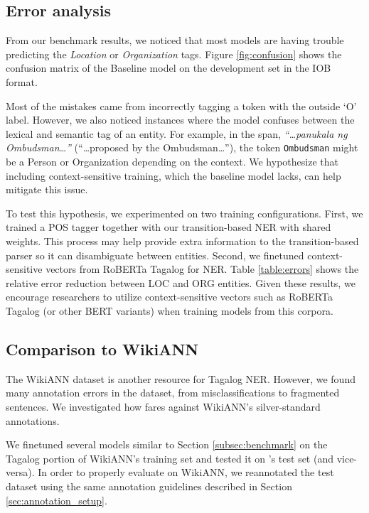 \documentclass[11pt]{article}
\begin{document}
\subsection{Error analysis}

From our benchmark results, we noticed that most models are having trouble predicting the \textit{Location} or \textit{Organization} tags.
Figure \ref{fig:confusion} shows the confusion matrix of the Baseline model on the development set in the IOB format.

Most of the mistakes came from incorrectly tagging a token with the outside `O' label.
However, we also noticed instances where the model confuses between the lexical and semantic tag of an entity.
For example, in the span, \textit{``\ldots panukala ng Ombudsman\ldots ''} (``\ldots proposed by the Ombudsman\ldots ''), the token \texttt{Ombudsman} might be a Person or Organization depending on the context.
We hypothesize that including context-sensitive training, which the baseline model lacks, can help mitigate this issue.

To test this hypothesis, we experimented on two training configurations.
First, we trained a POS tagger together with our transition-based NER with shared weights.
This process may help provide extra information to the transition-based parser so it can disambiguate between entities.
Second, we finetuned context-sensitive vectors from RoBERTa Tagalog \citep{Cruz2021ImprovingLL} for NER.
Table \ref{table:errors} shows the relative error reduction between LOC and ORG entities.
Given these results, we encourage researchers to utilize context-sensitive vectors such as RoBERTa Tagalog (or other BERT variants) when training models from this corpora.







\subsection{Comparison to WikiANN}

The WikiANN dataset \citep{Pan2017CrosslingualNT} is another resource for Tagalog NER.
However, we found many annotation errors in the dataset, from misclassifications to fragmented sentences.
We investigated how \tlunified{} fares against WikiANN's silver-standard annotations.


We finetuned several models similar to Section \ref{subsec:benchmark} on the Tagalog portion of WikiANN's training set and tested it on \tlunified{}'s test set (and vice-versa).
In order to properly evaluate on WikiANN, we reannotated the test dataset using the same annotation guidelines described in Section \ref{sec:annotation_setup}.
\end{document}
